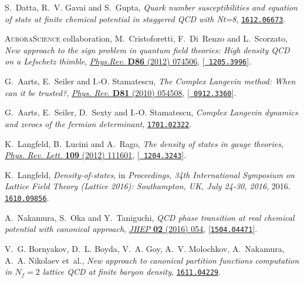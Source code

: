 \documentclass{PoS}
\begin{document}
\begin{thebibliography}{100}
S.~Datta, R.~V. Gavai and S.~Gupta, \emph{{Quark number susceptibilities and
  equation of state at finite chemical potential in staggered QCD with Nt=8}},
  \href{https://arxiv.org/abs/1612.06673}{{\tt 1612.06673}}.

{\scshape AuroraScience} collaboration, M.~Cristoforetti, F.~Di~Renzo and
  L.~Scorzato, \emph{{New approach to the sign problem in quantum field
  theories: High density QCD on a Lefschetz thimble}},
  \href{http://dx.doi.org/10.1103/PhysRevD.86.074506}{\emph{Phys.Rev.} {\bf
  D86} (2012) 074506}, [\href{https://arxiv.org/abs/1205.3996}{{\tt
  1205.3996}}].

G.~Aarts, E.~Seiler and I.-O. Stamatescu, \emph{{The Complex Langevin method:
  When can it be trusted?}},
  \href{http://dx.doi.org/10.1103/PhysRevD.81.054508}{\emph{Phys. Rev.} {\bf
  D81} (2010) 054508}, [\href{https://arxiv.org/abs/0912.3360}{{\tt
  0912.3360}}].

G.~Aarts, E.~Seiler, D.~Sexty and I.-O. Stamatescu, \emph{{Complex Langevin
  dynamics and zeroes of the fermion determinant}},
  \href{https://arxiv.org/abs/1701.02322}{{\tt 1701.02322}}.

K.~Langfeld, B.~Lucini and A.~Rago, \emph{{The density of states in gauge
  theories}},
  \href{http://dx.doi.org/10.1103/PhysRevLett.109.111601}{\emph{Phys. Rev.
  Lett.} {\bf 109} (2012) 111601}, [\href{https://arxiv.org/abs/1204.3243}{{\tt
  1204.3243}}].

K.~Langfeld, \emph{{Density-of-states}},  in \emph{{Proceedings, 34th
  International Symposium on Lattice Field Theory (Lattice 2016): Southampton,
  UK, July 24-30, 2016}}, 2016.
\newblock \href{https://arxiv.org/abs/1610.09856}{{\tt 1610.09856}}.

A.~Nakamura, S.~Oka and Y.~Taniguchi, \emph{{QCD phase transition at real
  chemical potential with canonical approach}},
  \href{http://dx.doi.org/10.1007/JHEP02(2016)054}{\emph{JHEP} {\bf 02} (2016)
  054}, [\href{https://arxiv.org/abs/1504.04471}{{\tt 1504.04471}}].

V.~G. Bornyakov, D.~L. Boyda, V.~A. Goy, A.~V. Molochkov, A.~Nakamura, A.~A.
  Nikolaev et~al., \emph{{New approach to canonical partition functions
  computation in $N_f=2$ lattice QCD at finite baryon density}},
  \href{https://arxiv.org/abs/1611.04229}{{\tt 1611.04229}}.


\end{thebibliography}
\end{document}
